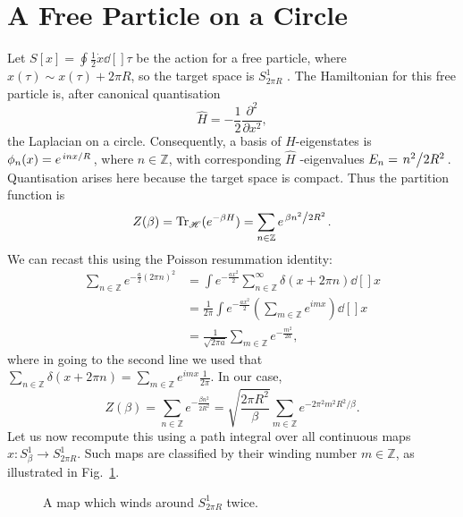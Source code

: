
\section{A Free Particle on a Circle}%
\label{sec:a_free_particle_on_a_circle}

Let $S[x] = \oint \frac{1}{2} \dot{x} \dd[]{\tau}$ be the action for a free particle, where $x(\tau) \sim x(\tau) + 2\pi R$, so the target space is $S^1_{2\pi R}$ .
The Hamiltonian for this free particle is, after canonical quantisation
\begin{equation}
  \hat{H} = -\frac{1}{2} \frac{\partial^2}{\partial x^2},
\end{equation}
the Laplacian on a circle.
Consequently, a basis of $\hat{H}$-eigenstates is $\phi_n(x) = e^{\flatfrac{i n x}{R}}$, where $n \in \mathbb{Z}$, with corresponding $\hat{H}$ -eigenvalues $E_n = \flatfrac{n^2}{2R^2}$.
Quantisation arises here because the target space is compact.
Thus the partition function is
\begin{equation}
  Z(\beta) = \Tr_{\mathscr{H}} (e^{-\beta H}) = \sum_{n \in \mathbb{Z}} e^{\flatfrac{\beta n^2}{2 R^2}}.
\end{equation}
We can recast this using the Poisson resummation identity:
\begin{align}
  \sum_{n \in \mathbb{Z}} e^{- \frac{a}{2}(2\pi n)^2} &= \int e^{-\frac{ax^2}{2}} \sum_{n \in \mathbb{Z}}^{\infty} \delta(x + 2 \pi n) \dd[]{x} \\
						      &= \frac{1}{2\pi} \int e^{-\frac{ax^2}{2}} (\sum_{m\in \mathbb{Z}} e^{imx}) \dd[]{x} \\
						      &= \frac{1}{\sqrt{2\pi a}} \sum_{m \in \mathbb{Z}} e^{-\frac{m^2}{2a}},
\end{align}
where in going to the second line we used that $\sum_{n \in \mathbb{Z}} \delta(x + 2 \pi n) = \sum_{m \in \mathbb{Z}} e^{imx} \frac{1}{2\pi}$.
In our case, 
\begin{equation}
  Z(\beta) = \sum_{n\in \mathbb{Z}} e^{-\frac{\beta n^2}{2R^2}} = \sqrt{\frac{2\pi R^2}{\beta}} \sum_{m\in \mathbb{Z}} e^{-2 \pi^2 m^2 R^2 / \beta}.
\end{equation}
Let us now recompute this using a path integral over all continuous maps $x\colon S^1_\beta \to S^1_{2\pi R}$. Such maps are classified by their winding number $m \in \mathbb{Z}$, as illustrated in Fig.~\ref{fig:l6f1}.
\begin{figure}[tbhp]
  \centering
  \def\svgwidth{0.4\columnwidth}
  
  \caption{A map which winds around $S^1_{2\pi R}$ twice.}
  \label{fig:l6f1}
\end{figure}
